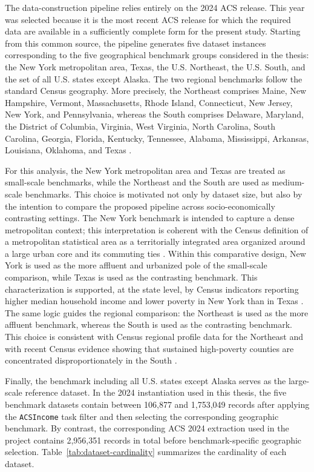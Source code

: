 The data-construction pipeline relies entirely on the 2024 ACS release. This year was selected because it is the most recent ACS release for which the required data are available in a sufficiently complete form for the present study. Starting from this common source, the pipeline generates five dataset instances corresponding to the five geographical benchmark groups considered in the thesis: the New York metropolitan area, Texas, the U.S. Northeast, the U.S. South, and the set of all U.S. states except Alaska. The two regional benchmarks follow the standard Census geography. More precisely, the Northeast comprises Maine, New Hampshire, Vermont, Massachusetts, Rhode Island, Connecticut, New Jersey, New York, and Pennsylvania, whereas the South comprises Delaware, Maryland, the District of Columbia, Virginia, West Virginia, North Carolina, South Carolina, Georgia, Florida, Kentucky, Tennessee, Alabama, Mississippi, Arkansas, Louisiana, Oklahoma, and Texas \cite{censusregions}.

For this analysis, the New York metropolitan area and Texas are treated as small-scale benchmarks, while the Northeast and the South are used as medium-scale benchmarks. This choice is motivated not only by dataset size, but also by the intention to compare the proposed pipeline across socio-economically contrasting settings. The New York benchmark is intended to capture a dense metropolitan context; this interpretation is coherent with the Census definition of a metropolitan statistical area as a territorially integrated area organized around a large urban core and its commuting ties \cite{censusmetroglossary}. Within this comparative design, New York is used as the more affluent and urbanized pole of the small-scale comparison, while Texas is used as the contrasting benchmark. This characterization is supported, at the state level, by Census indicators reporting higher median household income and lower poverty in New York than in Texas \cite{quickfactsny,quickfactstx}. The same logic guides the regional comparison: the Northeast is used as the more affluent benchmark, whereas the South is used as the contrasting benchmark. This choice is consistent with Census regional profile data for the Northeast and with recent Census evidence showing that sustained high-poverty counties are concentrated disproportionately in the South \cite{censusnortheastprofile,censussouthpoverty}.

Finally, the benchmark including all U.S. states except Alaska serves as the large-scale reference dataset. In the 2024 instantiation used in this thesis, the five benchmark datasets contain between 106,877 and 1,753,049 records after applying the \texttt{ACSIncome} task filter and then selecting the corresponding geographic benchmark. By contrast, the corresponding ACS 2024 extraction used in the project contains 2,956,351 records in total before benchmark-specific geographic selection. Table~\ref{tab:dataset-cardinality} summarizes the cardinality of each dataset.

